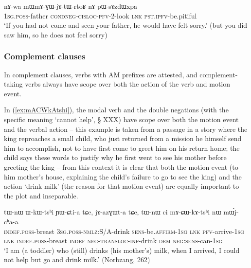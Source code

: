 \begin{exe}
\ex \label{ex:mWmAGWjAtWrtoR}
\gll nɤ-wa  mɯ\redp{}mɤ-ɣɯ-jɤ-tɯ-rtoʁ nɤ pɯ-sɤzdɯxpa \\
\textsc{1sg.poss}-father \textsc{cond}\redp{}\textsc{neg}-\textsc{cisloc}-\textsc{pfv}-2-look \textsc{lnk} \textsc{pst.ipfv}-be.pitiful \\ 
\glt `If you had not come and seen your father, he would have felt sorry.' (but you did saw him, so he does not feel sorry)
\end{exe}

\subsubsection{Complement clauses} \label{sec:am.complement}
In complement clauses, verbs with AM prefixes are attested, and complement-taking verbs always have scope over both the action of the verb and motion event.

 
In (\ref{ex:mACWkAtshi}), the modal verb  and the double negations (with the specific meaning `cannot help', § XXX) have scope over both the motion event and the verbal action -- this example is taken from a passage in a story where the king reproaches a small child, who just returned from a mission he himself send him to accomplish, not to have first come to greet him on his return home; the child says these words to justify why he first went to see his mother before greeting the king -- from this context it is clear that both the motion event (to him mother's house, explaining the child's failure to go to see the king) and the action `drink milk' (the reason for that motion event) are equally important to the plot and inseparable. 

\begin{exe}
\ex \label{ex:mACWkAtshi}
\gll  tɯ-nɯ ɯ-kɯ-tsʰi ɲɯ-ɕti-a tɕe, jɤ-azɣɯt-a tɕe, tɯ-nɯ ci mɤ-ɕɯ-kɤ-tsʰi nɯ mɯ́j-cʰa-a \\
\textsc{indef}.\textsc{poss}-breast \textsc{3sg}.\textsc{poss}-\textsc{nmlz}:S/A-drink \textsc{sens}-be.\textsc{affirm}-\textsc{1sg} \textsc{lnk} \textsc{pfv}-arrive-\textsc{1sg} \textsc{lnk} \textsc{indef}.\textsc{poss}-breast  \textsc{indef} \textsc{neg}-\textsc{transloc}-\textsc{inf}-drink \textsc{dem} \textsc{neg}:\textsc{sens}-can-\textsc{1sg} \\
\glt `I am (a toddler) who (still) drinks (his mother's) milk, when I arrived, I could not help but go and drink milk.'  (Norbzang, 262)
 \end{exe}
 
